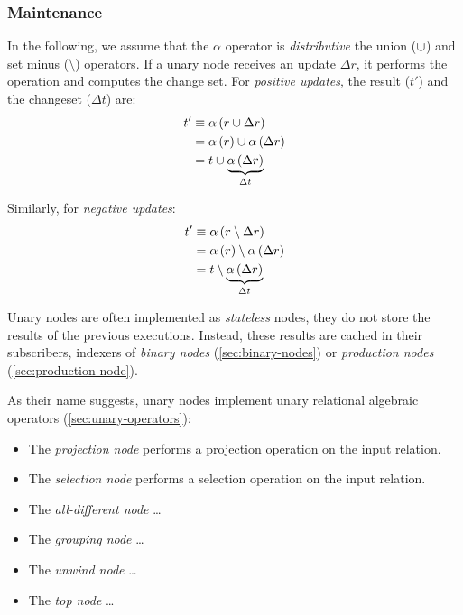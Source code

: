 \subsubsection{Maintenance}

In the following, we assume that the $\alpha$ operator is \emph{distributive} \wrt the union ($\cup$) and set minus ($\setminus$) operators. If a unary node receives an update $\Delta r$, it performs the operation and computes the change set. For \emph{positive updates}, the result ($t'$) and the changeset ($\Delta t$) are:
\begin{align*}
	t'       & \equiv \mathrm{\alpha}\left(r \cup \Delta r\right) \\
			 & = \mathrm{\alpha}\left(r\right) \cup \mathrm{\alpha}\left(\Delta r\right) \\
			 & = t \cup \underbrace{\mathrm{\alpha}\left(\Delta r\right)}_{\Delta t} \\
\end{align*}

Similarly, for \emph{negative updates}:
\begin{align*}
	t'       & \equiv \mathrm{\alpha}\left(r \setminus \Delta r\right) \\
			 & = \mathrm{\alpha}\left(r\right) \setminus \mathrm{\alpha}\left(\Delta r\right) \\
			 & = t \setminus \underbrace{\mathrm{\alpha}\left(\Delta r\right)}_{\Delta t}
\end{align*}

Unary nodes are often implemented as \emph{stateless} nodes, \ie they do not store the results of the previous executions. Instead, these results are cached in their subscribers, \eg indexers of \emph{binary nodes} (\autoref{sec:binary-nodes}) or \emph{production nodes} (\autoref{sec:production-node}).

As their name suggests, unary nodes implement unary relational algebraic operators (\autoref{sec:unary-operators}):

\begin{itemize}
	\item The \emph{projection node} performs a projection operation on the input relation.
	\item The \emph{selection node} performs a selection operation on the input relation.
	\item The \emph{all-different node} \ldots
	\item The \emph{grouping node} \ldots
	\item The \emph{unwind node} \ldots
	\item The \emph{top node} \ldots
\end{itemize}

